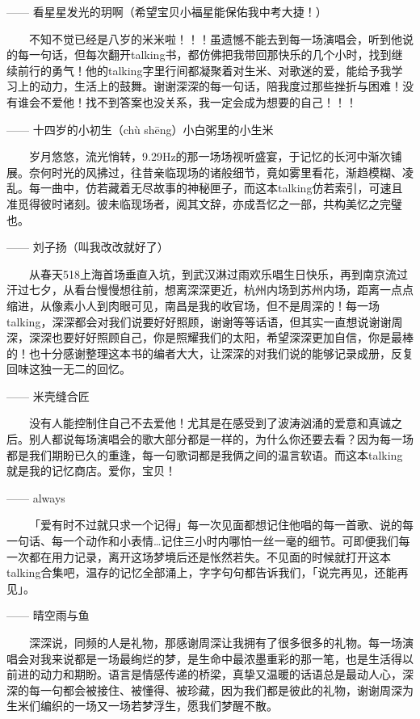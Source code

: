 \documentclass[]{ctexbook}
\begin{document}
------ 看星星发光的玥啊（希望宝贝小福星能保佑我中考大捷！）

  不知不觉已经是八岁的米米啦！！！虽遗憾不能去到每一场演唱会，听到他说的每一句话，但每次翻开talking书，都仿佛把我带回那快乐的几个小时，找到继续前行的勇气！他的talking字里行间都凝聚着对生米、对歌迷的爱，能给予我学习上的动力，生活上的鼓舞。谢谢深深的每一句话，陪我度过那些挫折与困难！没有谁会不爱他！找不到答案也没关系，我一定会成为想要的自己！！！

------ 十四岁的小初生（chù shēng）小白粥里的小生米

  岁月悠悠，流光悄转，9.29Hz的那一场场视听盛宴，于记忆的长河中渐次铺展。奈何时光的风拂过，往昔亲临现场的诸般细节，竟如雾里看花，渐趋模糊、凌乱。每一曲中，仿若藏着无尽故事的神秘匣子，而这本talking仿若索引，可速且准觅得彼时诸刻。彼未临现场者，阅其文辞，亦成吾忆之一部，共构美忆之完璧也。

------ 刘子扬（叫我改改就好了）

  从春天518上海首场垂直入坑，到武汉淋过雨欢乐唱生日快乐，再到南京流过汗过七夕，从看台慢慢想往前，想离深深更近，杭州内场到苏州内场，距离一点点缩进，从像素小人到肉眼可见，南昌是我的收官场，但不是周深的！每一场talking，深深都会对我们说要好好照顾，谢谢等等话语，但其实一直想说谢谢周深，深深也要好好照顾自己，你是照耀我们的太阳，希望深深更加自信，你是最棒的！也十分感谢整理这本书的编者大大，让深深的对我们说的能够记录成册，反复回味这独一无二的回忆。

------ 米壳缝合匠

  没有人能控制住自己不去爱他！尤其是在感受到了波涛汹涌的爱意和真诚之后。别人都说每场演唱会的歌大部分都是一样的，为什么你还要去看？因为每一场都是我们期盼已久的重逢，每一句歌词都是我俩之间的温言软语。而这本talking就是我的记忆商店。爱你，宝贝！

------ always

  「爱有时不过就只求一个记得」每一次见面都想记住他唱的每一首歌、说的每一句话、每一个动作和小表情\ldots 记住三小时内哪怕一丝一毫的细节。可即便我们每一次都在用力记录，离开这场梦境后还是怅然若失。不见面的时候就打开这本talking合集吧，温存的记忆全部涌上，字字句句都告诉我们，「说完再见，还能再见」。

------ 晴空雨与鱼

  深深说，同频的人是礼物，那感谢周深让我拥有了很多很多的礼物。每一场演唱会对我来说都是一场最绚烂的梦，是生命中最浓墨重彩的那一笔，也是生活得以前进的动力和期盼。语言是情感传递的桥梁，真挚又温暖的话语总是最动人心，深深的每一句都会被接住、被懂得、被珍藏，因为我们都是彼此的礼物，谢谢周深为生米们编织的一场又一场若梦浮生，愿我们梦醒不散。
\end{document}

